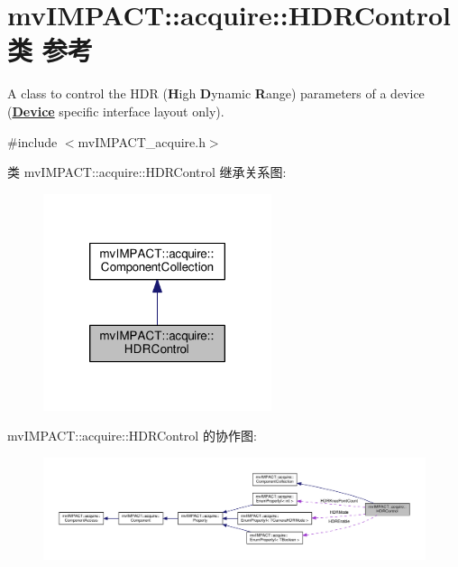 \hypertarget{classmv_i_m_p_a_c_t_1_1acquire_1_1_h_d_r_control}{\section{mv\+I\+M\+P\+A\+C\+T\+:\+:acquire\+:\+:H\+D\+R\+Control类 参考}
\label{classmv_i_m_p_a_c_t_1_1acquire_1_1_h_d_r_control}
}


A class to control the H\+D\+R ({\bfseries H}igh {\bfseries D}ynamic {\bfseries R}ange) parameters of a device ({\bfseries \hyperlink{classmv_i_m_p_a_c_t_1_1acquire_1_1_device}{Device}} specific interface layout only).  




{\ttfamily \#include $<$mv\+I\+M\+P\+A\+C\+T\+\_\+acquire.\+h$>$}



类 mv\+I\+M\+P\+A\+C\+T\+:\+:acquire\+:\+:H\+D\+R\+Control 继承关系图\+:
\nopagebreak
\begin{figure}[H]
\begin{center}
\leavevmode
\includegraphics[width=190pt]{classmv_i_m_p_a_c_t_1_1acquire_1_1_h_d_r_control__inherit__graph}
\end{center}
\end{figure}


mv\+I\+M\+P\+A\+C\+T\+:\+:acquire\+:\+:H\+D\+R\+Control 的协作图\+:
\nopagebreak
\begin{figure}[H]
\begin{center}
\leavevmode
\includegraphics[width=350pt]{classmv_i_m_p_a_c_t_1_1acquire_1_1_h_d_r_control__coll__graph}
\end{center}
\end{figure}
